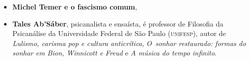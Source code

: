 \begin{itemize}


\item \textbf{Michel Temer e o fascismo comum}, \lipsum[1]
  
\item \textbf{Tales Ab’Sáber}, psicanalista e ensaísta, é professor de Filosofia da Psicanálise da Universidade Federal 
de São Paulo (\textsc{unifesp}), autor de 
\emph{Lulismo, carisma pop e cultura anticrítica},
\textit{O~sonhar
restaurado: formas do sonhar em Bion, Winnicott e Freud} e
\textit{A música do tempo infinito}. 

\end{itemize}

